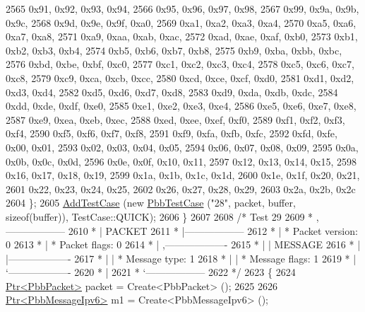 \begin{DoxyCode}
2565       0x91, 0x92, 0x93, 0x94,
2566       0x95, 0x96, 0x97, 0x98,
2567       0x99, 0x9a, 0x9b, 0x9c,
2568       0x9d, 0x9e, 0x9f, 0xa0,
2569       0xa1, 0xa2, 0xa3, 0xa4,
2570       0xa5, 0xa6, 0xa7, 0xa8,
2571       0xa9, 0xaa, 0xab, 0xac,
2572       0xad, 0xae, 0xaf, 0xb0,
2573       0xb1, 0xb2, 0xb3, 0xb4,
2574       0xb5, 0xb6, 0xb7, 0xb8,
2575       0xb9, 0xba, 0xbb, 0xbc,
2576       0xbd, 0xbe, 0xbf, 0xc0,
2577       0xc1, 0xc2, 0xc3, 0xc4,
2578       0xc5, 0xc6, 0xc7, 0xc8,
2579       0xc9, 0xca, 0xcb, 0xcc,
2580       0xcd, 0xce, 0xcf, 0xd0,
2581       0xd1, 0xd2, 0xd3, 0xd4,
2582       0xd5, 0xd6, 0xd7, 0xd8,
2583       0xd9, 0xda, 0xdb, 0xdc,
2584       0xdd, 0xde, 0xdf, 0xe0,
2585       0xe1, 0xe2, 0xe3, 0xe4,
2586       0xe5, 0xe6, 0xe7, 0xe8,
2587       0xe9, 0xea, 0xeb, 0xec,
2588       0xed, 0xee, 0xef, 0xf0,
2589       0xf1, 0xf2, 0xf3, 0xf4,
2590       0xf5, 0xf6, 0xf7, 0xf8,
2591       0xf9, 0xfa, 0xfb, 0xfc,
2592       0xfd, 0xfe, 0x00, 0x01,
2593       0x02, 0x03, 0x04, 0x05,
2594       0x06, 0x07, 0x08, 0x09,
2595       0x0a, 0x0b, 0x0c, 0x0d,
2596       0x0e, 0x0f, 0x10, 0x11,
2597       0x12, 0x13, 0x14, 0x15,
2598       0x16, 0x17, 0x18, 0x19,
2599       0x1a, 0x1b, 0x1c, 0x1d,
2600       0x1e, 0x1f, 0x20, 0x21,
2601       0x22, 0x23, 0x24, 0x25,
2602       0x26, 0x27, 0x28, 0x29,
2603       0x2a, 0x2b, 0x2c
2604     \};
2605     \hyperlink{classns3_1_1TestCase_a3718088e3eefd5d6454569d2e0ddd835}{AddTestCase} (\textcolor{keyword}{new} \hyperlink{classPbbTestCase}{PbbTestCase} (\textcolor{stringliteral}{"28"}, packet, buffer, \textcolor{keyword}{sizeof}(buffer)), 
      TestCase::QUICK);
2606   \}
2607 
2608   \textcolor{comment}{/* Test 29}
2609 \textcolor{comment}{         * ,------------------}
2610 \textcolor{comment}{         * |  PACKET}
2611 \textcolor{comment}{         * |------------------}
2612 \textcolor{comment}{         * | * Packet version:    0}
2613 \textcolor{comment}{         * | * Packet flags:  0}
2614 \textcolor{comment}{         * |    ,-------------------}
2615 \textcolor{comment}{         * |    |  MESSAGE}
2616 \textcolor{comment}{         * |    |-------------------}
2617 \textcolor{comment}{         * |    | * Message type:       1}
2618 \textcolor{comment}{         * |    | * Message flags:  1}
2619 \textcolor{comment}{         * |    `-------------------}
2620 \textcolor{comment}{         * |}
2621 \textcolor{comment}{         * `------------------}
2622 \textcolor{comment}{   */}
2623   \{
2624     \hyperlink{classns3_1_1Ptr}{Ptr<PbbPacket>} packet = Create<PbbPacket> ();
2625 
2626     \hyperlink{classns3_1_1Ptr}{Ptr<PbbMessageIpv6>} m1 = Create<PbbMessageIpv6> ();

\end{DoxyCode}
